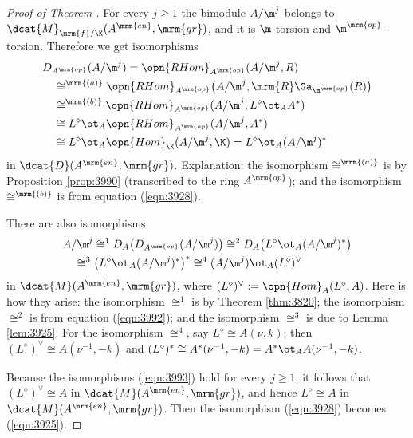 \begin{proof}[Proof of Theorem \tup{\ref{thm:3781}}]
For every $j \geq 1$ the bimodule 
$A / \m^j$ belongs to $\dcat{M}_{\mrm{f}/ \K}(A^{\mrm{en}}, \mrm{gr})$,
and it is $\m$-torsion and $\m^{\mrm{op}}$-torsion. 
Therefore we get isomorphisms 
\begin{equation} \label{eqn:3992}
\begin{aligned}
& D_{A^{\mrm{op}}}(A / \m^j) = \opn{RHom}_{A^{\mrm{op}}}(A / \m^j, R)
\\ & \quad 
\cong^{\mrm{(a)}} 
\opn{RHom}_{A^{\mrm{op}}} 
\bigl( A / \m^j, \mrm{R} \Ga_{\m^{\mrm{op}}}(R) \bigr)
\\ & \quad 
\cong^{\mrm{(b)}} 
\opn{RHom}_{A^{\mrm{op}}}(A / \m^j, L^{\diamond} \ot_A  A^*) 
\\ & \quad 
\cong L^{\diamond} \ot_A \opn{RHom}_{A^{\mrm{op}}}(A / \m^j, A^*) 
\\ & \quad 
\cong L^{\diamond} \ot_A  \opn{Hom}_{\K}(A / \m^j, \K) 
= L^{\diamond} \ot_A (A / \m^j)^* 
\end{aligned} 
\end{equation}
in $\dcat{D}(A^{\mrm{en}}, \mrm{gr})$.
Explanation: the isomorphism $\cong^{\mrm{(a)}}$ is by Proposition 
\ref{prop:3990} (transcribed to the ring $A^{\mrm{op}}$); and the isomorphism 
$\cong^{\mrm{(b)}}$ is from equation (\ref{eqn:3928}).

There are also isomorphisms 
\begin{equation} \label{eqn:3993}
\begin{aligned}
&
A / \m^j \cong^1 D_A \bigl( D_{A^{\mrm{op}}}(A / \m^j) \bigr)
\cong^2 D_A \bigl( L^{\diamond} \ot_A (A / \m^j)^* \bigr)
\\ & \quad 
\cong^3 \bigl( L^{\diamond} \ot_A (A / \m^j)^* \bigr)^*
\cong^4 (A / \m^j) \ot_A (L^{\diamond})^{\vee}
\end{aligned} 
\end{equation}
in $\dcat{M}(A^{\mrm{en}}, \mrm{gr})$, where
$(L^{\diamond})^{\vee} := \opn{Hom}_A(L^{\diamond}, A)$.
Here is how they arise: the isomorphism $\cong^1$ is by Theorem \ref{thm:3820};
the isomorphism $\cong^2$ is from equation (\ref{eqn:3992}); 
and the isomorphism $\cong^3$ is due to Lemma \ref{lem:3925}.
For the isomorphism $\cong^4$, say 
$L^{\diamond} \cong A(\nu, k)$; then 
$(L^{\diamond})^{\vee} \cong A(\nu^{-1}, -k)$ and 
$(L^{\diamond})^{*} \cong A^*(\nu^{-1}, -k) = A^* \ot_{A} A(\nu^{-1}, -k)$.

Because the isomorphisms (\ref{eqn:3993}) hold for every $j \geq 1$, it follows 
that $(L^{\diamond})^{\vee} \cong A$ in 
$\dcat{M}(A^{\mrm{en}}, \mrm{gr})$,
and hence 
$L^{\diamond} \cong A$ in 
$\dcat{M}(A^{\mrm{en}}, \mrm{gr})$.
Then the isomorphism (\ref{eqn:3928}) becomes (\ref{eqn:3925}). 
\end{proof}

